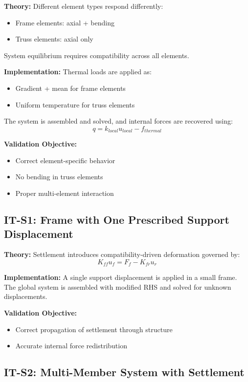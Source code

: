 \textbf{Theory:}  
Different element types respond differently:
\begin{itemize}
    \item Frame elements: axial + bending
    \item Truss elements: axial only
\end{itemize}
System equilibrium requires compatibility across all elements.

\textbf{Implementation:}  
Thermal loads are applied as:
\begin{itemize}
    \item Gradient + mean for frame elements
    \item Uniform temperature for truss elements
\end{itemize}
The system is assembled and solved, and internal forces are recovered using:
\[
q = k_{local} u_{local} - f_{thermal}
\]

\textbf{Validation Objective:}
\begin{itemize}
    \item Correct element-specific behavior
    \item No bending in truss elements
    \item Proper multi-element interaction
\end{itemize}

\subsection{IT-S1: Frame with One Prescribed Support Displacement}

\textbf{Theory:}  
Settlement introduces compatibility-driven deformation governed by:
\[
K_{ff} u_f = F_f - K_{fr} u_r
\]

\textbf{Implementation:}  
A single support displacement is applied in a small frame. The global system is assembled with modified RHS and solved for unknown displacements.

\textbf{Validation Objective:}
\begin{itemize}
    \item Correct propagation of settlement through structure
    \item Accurate internal force redistribution
\end{itemize}

\subsection{IT-S2: Multi-Member System with Settlement}

